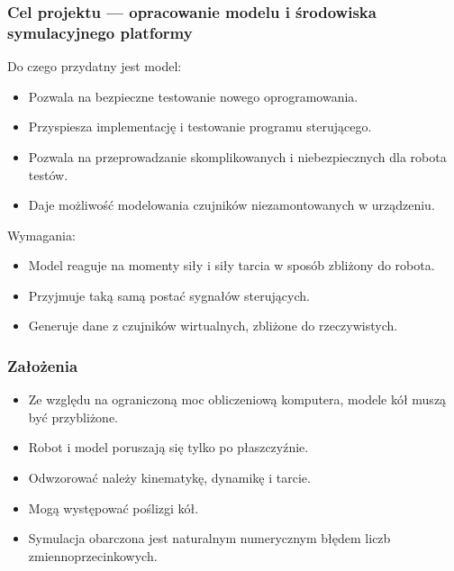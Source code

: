 \documentclass{beamer}
\begin{document}
	\begin{frame}
		\frametitle{Cel projektu --- opracowanie modelu i środowiska symulacyjnego platformy}
		Do czego przydatny jest model:
		\begin{itemize}
			\item Pozwala na bezpieczne testowanie nowego oprogramowania.
			\item Przyspiesza implementację i testowanie programu sterującego.
			\item Pozwala na przeprowadzanie skomplikowanych i niebezpiecznych dla robota testów.
			\item Daje możliwość modelowania czujników niezamontowanych w urządzeniu.
		\end{itemize}
		Wymagania:
		\begin{itemize}
			\item Model reaguje na momenty siły i siły tarcia w sposób zbliżony do robota.
			\item Przyjmuje taką samą postać sygnałów sterujących.
			\item Generuje dane z czujników wirtualnych, zbliżone do rzeczywistych.
		\end{itemize}
	\end{frame}
	
	\begin{frame}
		\frametitle{Założenia}
		\begin{itemize}
			\item Ze względu na ograniczoną moc obliczeniową komputera, modele kół muszą być przybliżone.
			\item Robot i model poruszają się tylko po płaszczyźnie.
			\item Odwzorować należy kinematykę, dynamikę i tarcie.
			\item Mogą występować poślizgi kół.
			\item Symulacja obarczona jest naturalnym numerycznym błędem liczb zmiennoprzecinkowych.
		\end{itemize}
	\end{frame}

	
\end{document}
